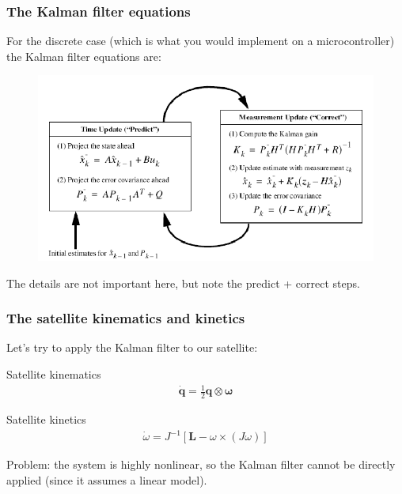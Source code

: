 \documentclass{beamer}
\begin{document}

\begin{frame}
    \frametitle{The Kalman filter equations}
    For the discrete case (which is what you would implement on a microcontroller) the Kalman filter equations are:
    \begin{figure}
        \includegraphics[width=0.8\linewidth]{kf_equations.png}
    \end{figure}
    The details are not important here, but note the predict + correct steps. 
\end{frame}


\begin{frame}
    \frametitle{The satellite kinematics and kinetics}
    Let's try to apply the Kalman filter to our satellite:
    \begin{block}{Satellite kinematics}
        \begin{equation}
            \begin{aligned}
                \dot{\mathbf{q}}=\frac{1}{2} \mathbf{q} \otimes \boldsymbol{\omega}
            \end{aligned}
        \end{equation}
    \end{block}
    \begin{block}{Satellite kinetics}
        \begin{equation}
            \begin{aligned}
                \dot{\omega}=J^{-1}\left[\mathbf{L}-\omega \times\left(J \omega\right)\right]
            \end{aligned}
        \end{equation}
    \end{block}
    Problem: the system is highly nonlinear, so the Kalman filter cannot be directly applied (since it assumes a linear model).
\end{frame}
\end{document}
